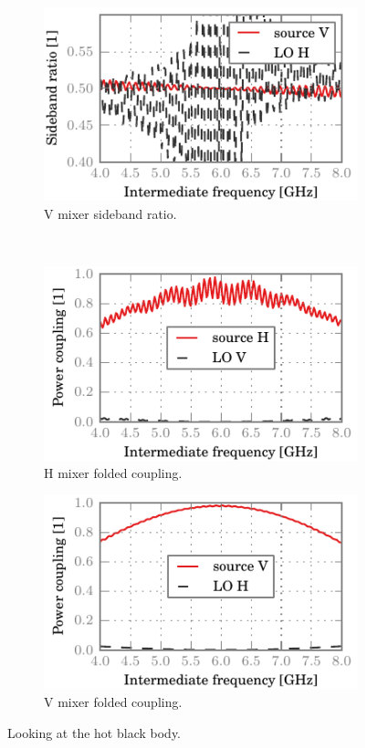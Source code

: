 \begin{figure}[hbtp]
    \begin{subfigure}[b]{.5\textwidth}
        \includegraphics{chapter_3/14_hbb_v_sbr}%
        \caption{V mixer sideband ratio.}
    \end{subfigure}%
    \\
    \begin{subfigure}[b]{.5\textwidth}
        \includegraphics{chapter_3/14_hbb_h_ssb}%
        \caption{H mixer folded coupling.}
    \end{subfigure}%
    \begin{subfigure}[b]{.5\textwidth}
        \includegraphics{chapter_3/14_hbb_v_ssb}%
        \caption{V mixer folded coupling.}
    \end{subfigure}%
    \caption{Looking at the hot black body.}
    \label{fig:14_hbb}
\end{figure}

